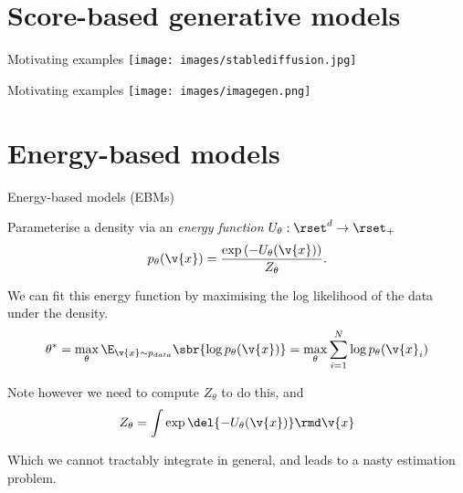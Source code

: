 
\section{Score-based generative models}

\begin{frame}{Motivating examples}
    \centering
    \texttt{[image: images/stablediffusion.jpg]}
\end{frame}
\begin{frame}{Motivating examples}
    \texttt{[image: images/imagegen.png]}
\end{frame}


\section{Energy-based models}

\begin{frame}{Energy-based models (EBMs)}

Parameterise a density via an \textit{energy function} $U_\theta: \rset^d \rightarrow \rset_+$
\begin{equation}
    p_\theta(\v{x}) = \frac{\exp\left(-U_\theta(\v{x})\right)}{Z_\theta}.
\end{equation}

\pause
We can fit this energy function by maximising the log likelihood of the data under the density.
\begin{equation}
    \theta^* = \max_\theta \E_{\v{x}\sim p_{data}}\sbr{\log p_\theta(\v{x})} = \max_\theta \sum_{i=1}^N \log p_\theta(\v{x}_i)
\end{equation}

\pause
Note however we need to compute $Z_\theta$ to do this, and 
\begin{equation}
    Z_\theta = \int \exp\del{-U_\theta(\v{x})} \rmd \v{x}
\end{equation}

Which we cannot tractably integrate in general, and leads to a nasty estimation problem.




\end{frame}


